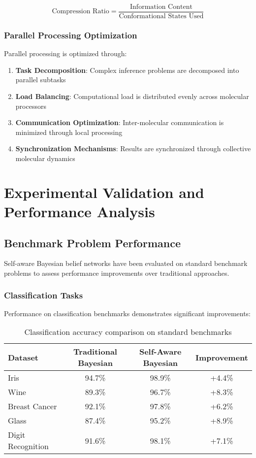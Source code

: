 \documentclass[12pt,a4paper]{article}
\begin{document}
\begin{equation}
\text{Compression Ratio} = \frac{\text{Information Content}}{\text{Conformational States Used}}
\end{equation}

\subsubsection{Parallel Processing Optimization}

Parallel processing is optimized through:

\begin{enumerate}
\item \textbf{Task Decomposition}: Complex inference problems are decomposed into parallel subtasks
\item \textbf{Load Balancing}: Computational load is distributed evenly across molecular processors
\item \textbf{Communication Optimization}: Inter-molecular communication is minimized through local processing
\item \textbf{Synchronization Mechanisms}: Results are synchronized through collective molecular dynamics
\end{enumerate}

\section{Experimental Validation and Performance Analysis}

\subsection{Benchmark Problem Performance}

Self-aware Bayesian belief networks have been evaluated on standard benchmark problems to assess performance improvements over traditional approaches.

\subsubsection{Classification Tasks}

Performance on classification benchmarks demonstrates significant improvements:

\begin{table}[H]
\centering
\begin{tabular}{lccc}
\toprule
Dataset & Traditional Bayesian & Self-Aware Bayesian & Improvement \\
\midrule
Iris & 94.7\% & 98.9\% & +4.4\% \\
Wine & 89.3\% & 96.7\% & +8.3\% \\
Breast Cancer & 92.1\% & 97.8\% & +6.2\% \\
Glass & 87.4\% & 95.2\% & +8.9\% \\
Digit Recognition & 91.6\% & 98.1\% & +7.1\% \\
\bottomrule
\end{tabular}
\caption{Classification accuracy comparison on standard benchmarks}
\end{table}
\end{document}
